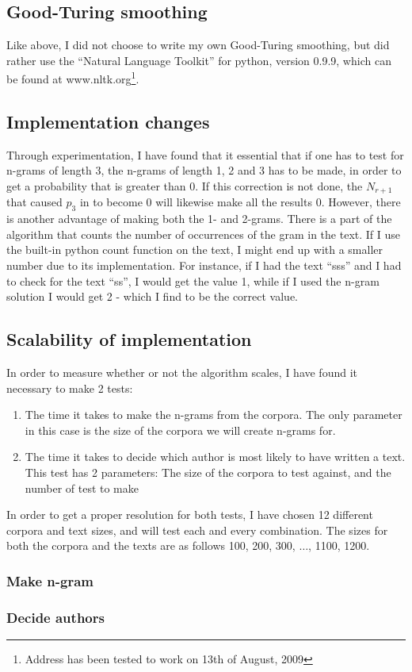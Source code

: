 \subsection{Good-Turing smoothing}
Like above, I did not choose to write my own Good-Turing smoothing, but did rather use the ``Natural Language Toolkit'' for python, version 0.9.9, which can be found at www.nltk.org\footnote{Address has been tested to work on 13th of August, 2009}.

\subsection{Implementation changes}
Through experimentation, I have found that it essential that if one has to test for n-grams of length 3, the n-grams of length 1, 2 and 3 has to be made, in order to get a probability that is greater than 0. If this correction is not done, the $N_{r+1}$ that caused $p_3$ in  to become 0 will likewise make all the results 0. However, there is another advantage of making both the 1- and 2-grams. There is a part of the algorithm that counts the number of occurrences of the gram in the text. If I use the built-in python count function on the text, I might end up with a smaller number due to its implementation. For instance, if I had the text ``sss'' and I had to check for the text ``ss'', I would get the value 1, while if I used the n-gram solution I would get 2 - which I find to be the correct value.

\subsection{Scalability of implementation}
In order to measure whether or not the algorithm scales, I have found it necessary to make 2 tests: 
\begin{enumerate}
\item The time it takes to make the n-grams from the corpora. The only parameter in this case is the size of the corpora we will create n-grams for.
\item The time it takes to decide which author is most likely to have written a text. This test has 2 parameters: The size of the corpora to test against, and the number of test to make
\end{enumerate}

In order to get a proper resolution for both tests, I have chosen 12 different corpora and text sizes, and will test each and every combination. The sizes for both the corpora and the texts are as follows 100, 200, 300, $\ldots$, 1100, 1200.

\subsubsection{Make n-gram}


\subsubsection{Decide authors}

